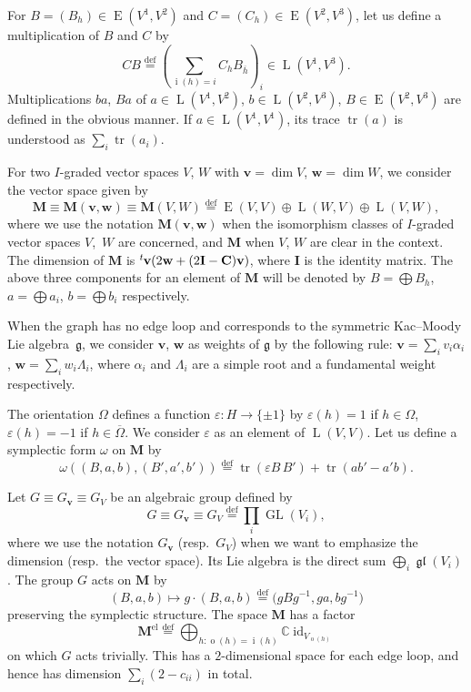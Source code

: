 \documentclass[pdftex]{sigma}
\theoremstyle{definition}
\numberwithin{equation}{section}
\newcommand{\lsp}[2]{{\mskip-.3mu}{}^{#1}\mskip-1mu{#2}}
\newcommand{\defeq}{\overset{\operatorname{\scriptstyle def}}{=}}
\newcommand{\C}{{\mathbb C}}
\newcommand{\GL}{\operatorname{GL}}
\newcommand{\gl}{\operatorname{\mathfrak{gl}}}
\newcommand{\g}{{\mathfrak g}}
\newcommand{\tr}{\operatorname{tr}}
\newcommand{\id}{\operatorname{id}}
\newcommand{\vin}[1]{\operatorname{i}(#1)} %
\newcommand{\vout}[1]{\operatorname{o}(#1)} %
\newcommand{\bM}{{\mathbf M}} %
\newcommand{\bv}{{\mathbf v}} %
\newcommand{\bw}{{\mathbf w}} %
\newcommand{\bC}{{\mathbf C}} %
\newcommand{\bI}{{\mathbf I}} %
\newcommand{\HomE}{\operatorname{E}}
\newcommand{\HomL}{\operatorname{L}}
\begin{document}
For $B = (B_h) \in \HomE(V^1, V^2)$ and
$C = (C_h) \in \HomE(V^2, V^3)$, let us def\/ine a multiplication of $B$
and $C$ by
\[
  CB \defeq \left(\sum_{\vin{h} = i} C_h B_{\overline h}\right)_i \in
  \HomL(V^1, V^3).
\]
Multiplications $ba$, $Ba$ of $a\in \HomL(V^1,V^2)$, $b\in\HomL(V^2,
V^3)$, $B\in \HomE(V^2, V^3)$ are def\/ined in the obvious manner. If
$a\in\HomL(V^1, V^1)$, its trace $\tr(a)$ is understood as $\sum_i
\tr(a_i)$.

For two $I$-graded vector spaces $V$, $W$ with $\bv = \dim V$, $\bw =
\dim W$, we consider the vector space given by
\begin{equation*}\label{def:bM}
  \bM \equiv \bM(\bv,\bw) \equiv \bM(V, W) \defeq
  \HomE(V,V)\oplus \HomL(W,V)\oplus \HomL(V,W),
\end{equation*}
where we use the notation $\bM(\bv,\bw)$ when the isomorphism classes
of $I$-graded vector spaces $V$,~$W$ are concerned, and $\bM$ when
$V$, $W$ are clear in the context.
%
The dimension of $\bM$ is $\lsp{t}{\bv}(2\bw + (2\bI - \bC)\bv)$,
where $\bI$ is the identity matrix.
The above three components for an element of $\bM$ will be denoted by
$B = \bigoplus B_h $, $a = \bigoplus a_i$, $b = \bigoplus b_i$
respectively.

When the graph has no edge loop and corresponds to the symmetric
Kac--Moody Lie algeb\-ra~$\g$, we consider $\bv$, $\bw$ as weights of
$\g$ by the following rule: $\bv = \sum_i v_i \alpha_i$, $\bw = \sum_i
w_i\Lambda_i$, where $\alpha_i$ and $\Lambda_i$ are a simple root and
a fundamental weight respectively.

The orientation $\Omega$ def\/ines a function $\varepsilon\colon H \to
\{ \pm 1\}$ by $\varepsilon(h) = 1$ if $h\in\Omega$, $\varepsilon(h)=
-1$ if $h\in\overline\Omega$. We consider $\varepsilon$ as an element
of $\HomL(V, V)$.
%
Let us def\/ine a symplectic form $\omega$ on $\bM$ by
\begin{equation*}
        \omega((B, a, b), (B', a', b'))
        \defeq \tr(\varepsilon B\, B') + \tr(a b' - a' b).
\label{def:symplectic}\end{equation*}

Let $G \equiv G_\bv \equiv G_V$ be an algebraic group def\/ined by
\begin{equation*}
   G \equiv G_\bv \equiv G_V \defeq \prod_i \GL(V_i),
\end{equation*}
where we use the notation $G_\bv$ (resp.\ $G_V$) when we want to
emphasize the dimension (resp.\ the vector space). Its Lie algebra is
the direct sum $\bigoplus_i \gl(V_i)$.
%
The group $G$ acts on $\bM$ by
\begin{equation*}\label{eq:Kaction}
  (B,a,b) \mapsto g\cdot (B,a,b)
  \defeq \big(g B g^{-1}, ga, bg^{-1}\big)
\end{equation*}
preserving the symplectic structure. The space $\bM$ has a factor
\begin{equation}\label{eq:trivial}
   \bM^{\text{el}}\defeq
   \bigoplus_{h : \vout{h} = \vin{h}} \C \id_{V_{\vout{h}}}
\end{equation}
on which $G$ acts trivially. This has a $2$-dimensional space for each
edge loop, and hence has dimension $\sum_i (2 - c_{ii})$ in total.
\end{document}
